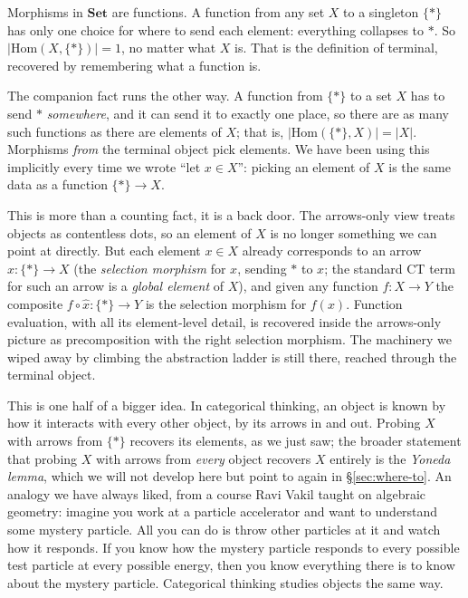 Morphisms in $\mathbf{Set}$ are functions. A function from any set $X$ to a
singleton $\{*\}$ has only one choice for where to send each element:
everything collapses to $*$. So $|\mathrm{Hom}(X, \{*\})| = 1$, no matter what
$X$ is. That is the definition of terminal, recovered by remembering what a
function is.

The companion fact runs the other way. A function from $\{*\}$ to a set $X$
has to send $*$ \textit{somewhere}, and it can send it to exactly one place, so
there are as many such functions as there are elements of $X$; that is,
$|\mathrm{Hom}(\{*\}, X)| = |X|$. Morphisms \textit{from} the terminal object
pick elements. We have been using this implicitly every time we wrote ``let
$x \in X$'': picking an element of $X$ is the same data as a function
$\{*\} \to X$.

This is more than a counting fact, it is a back door. The arrows-only view
treats objects as contentless dots, so an element of $X$ is no longer
something we can point at directly. But each element $x \in X$ already
corresponds to an arrow $\hat{x} : \{*\} \to X$ (the \textit{selection
morphism} for $x$, sending $*$ to $x$; the
standard CT term for such an arrow is a \textit{global
element} of $X$), and given
any function $f : X \to Y$ the composite $f \circ \hat{x} : \{*\} \to Y$ is
the selection morphism for $f(x)$. Function evaluation, with all its
element-level detail, is recovered inside the arrows-only picture as
precomposition with the right selection morphism. The machinery we wiped
away by climbing the abstraction ladder is still there, reached through
the terminal object.

This is one half of a bigger idea. In categorical thinking, an object is
known by how it interacts with every other object, by its arrows in and
out. Probing $X$ with arrows from $\{*\}$ recovers its elements, as we
just saw; the broader statement that probing $X$ with arrows from
\textit{every} object recovers $X$ entirely is the \textit{Yoneda
lemma}, which we will not develop here but point to
again in \S\ref{sec:where-to}. An analogy we have always liked, from a
course Ravi Vakil taught on algebraic geometry: imagine you work at a
particle accelerator and want to understand some mystery particle. All you
can do is throw other particles at it and watch how it responds. If you
know how the mystery particle responds to every possible test particle at
every possible energy, then you know everything there is to know about the
mystery particle. Categorical thinking studies objects the same way.

